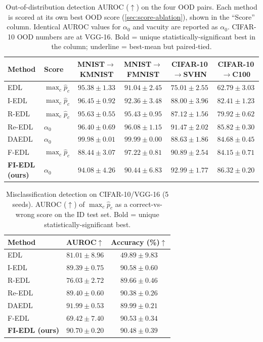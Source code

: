 \documentclass[review,5p,times]{elsarticle}
\begin{document}
\begin{table}[t]
  \centering
  \caption{Out-of-distribution detection AUROC ($\uparrow$) on the four
    OOD pairs. Each method is scored at its own best OOD score
    (\autoref{sec:score-ablation}), shown in the ``Score'' column.
    Identical AUROC values for $\alpha_0$ and vacuity are reported as
    $\alpha_0$. CIFAR-10 OOD numbers are at VGG-16. Bold = unique
    statistically-significant best in the column; underline = best-mean
    but paired-tied.}
  \label{tab:main-ood}
  \small
  \begin{tabular}{llcccc}
    \toprule
    Method & Score & MNIST$\to$KMNIST & MNIST$\to$FMNIST & CIFAR-10$\to$SVHN & CIFAR-10$\to$C100 \\
    \midrule
    EDL    & $\max_c\hat p_c$ & $95.38 \pm 1.33$ & $91.04 \pm 2.45$ & $75.01 \pm 2.55$ & $62.79 \pm 3.03$ \\
    I-EDL  & $\max_c\hat p_c$ & $96.45 \pm 0.92$ & $92.36 \pm 3.48$ & $88.00 \pm 3.96$ & $82.41 \pm 1.23$ \\
    R-EDL  & $\max_c\hat p_c$ & $95.63 \pm 0.55$ & $95.43 \pm 0.95$ & $87.12 \pm 1.56$ & $79.92 \pm 0.62$ \\
    Re-EDL & $\alpha_0$       & $96.40 \pm 0.69$ & $96.08 \pm 1.15$ & $91.47 \pm 2.02$ & $85.82 \pm 0.30$ \\
    DAEDL  & $\alpha_0$       & $\mathbf{99.98 \pm 0.01}$ & $\mathbf{99.99 \pm 0.00}$ & $88.63 \pm 1.86$ & $84.68 \pm 0.45$ \\
    F-EDL  & $\max_c\hat p_c$ & $88.44 \pm 3.07$ & $97.22 \pm 0.81$ & $90.89 \pm 2.54$ & $84.15 \pm 0.71$ \\
    \textbf{FI-EDL (ours)} & $\alpha_0$ & $94.08 \pm 4.26$ & $90.44 \pm 6.83$ & \underline{$92.99 \pm 1.77$} & $\mathbf{86.32 \pm 0.20}$ \\
    \bottomrule
  \end{tabular}
\end{table}

\begin{table}[t]
  \centering
  \caption{Misclassification detection on CIFAR-10/VGG-16 (5 seeds).
    AUROC ($\uparrow$) of $\max_c\hat p_c$ as a correct-vs-wrong score
    on the ID test set. Bold = unique statistically-significant best.}
  \label{tab:main-misc}
  \small
  \begin{tabular}{lcc}
    \toprule
    Method & AUROC$\uparrow$ & Accuracy (\%)$\uparrow$ \\
    \midrule
    EDL    & $81.01 \pm 8.96$ & $49.89 \pm 9.83$ \\
    I-EDL  & $89.39 \pm 0.75$ & $90.58 \pm 0.60$ \\
    R-EDL  & $76.03 \pm 2.72$ & $89.66 \pm 0.46$ \\
    Re-EDL & $89.40 \pm 0.60$ & $90.38 \pm 0.26$ \\
    DAEDL  & $\mathbf{91.99 \pm 0.53}$ & $89.99 \pm 0.21$ \\
    F-EDL  & $69.42 \pm 7.40$ & $90.53 \pm 0.34$ \\
    \textbf{FI-EDL (ours)} & $90.70 \pm 0.20$ & $90.48 \pm 0.39$ \\
    \bottomrule
  \end{tabular}
\end{table}
\end{document}
